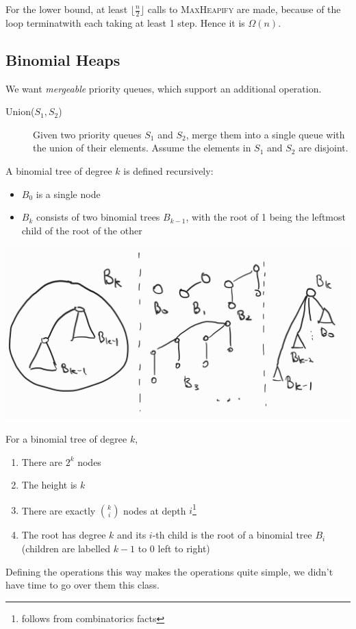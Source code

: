For the lower bound, at least $\lfloor \frac{n}{2} \rfloor$ calls to \textsc{MaxHeapify} are made, because of the loop terminatwith each taking at least 1 step. Hence it is $\Omega(n)$.

\subsection{Binomial Heaps}

We want \textit{mergeable} priority queues, which support an additional operation.
\begin{description}
    \item[Union($S_1, S_2$)] Given two priority queues $S_1$ and $S_2$, merge them into a single queue with the union of their elements. Assume the elements in $S_1$ and $S_2$ are disjoint. 
\end{description}

\begin{definition}
A binomial tree of degree $k$ is defined recursively:
\begin{itemize} 
\item $B_0$ is a single node 
    \item $B_k$ consists of two binomial trees $B_{k-1}$, with the root of 1 being the leftmost child of the root of the other 
\end{itemize}
\end{definition}

\includegraphics{csc265/figures/binomialtree.jpg}

\noindent For a binomial tree of degree $k$,
\begin{enumerate}
\item There are $2^k$ nodes
\item The height is $k$
    \item There are exactly $\binom{k}{i}$ nodes at depth $i$\footnote{follows from combinatorics facts}
    \item The root has degree $k$ and its $i$-th child is the root of a binomial tree $B_i$ (children are labelled $k-1$ to 0 left to right) 
\end{enumerate}

Defining the operations this way makes the operations quite simple, we didn't have time to go over them this class.
